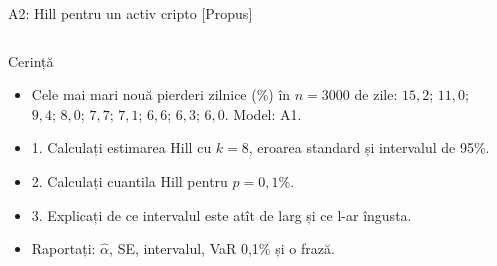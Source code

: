 \begin{frame}{A2: Hill pentru un activ cripto [Propus]}
\propsub
\itemsize{\scriptsize}
\begin{columns}[T]
\begin{column}{\taskw}
\begin{block}{Cerință}
\begin{itemize}
    \item Cele mai mari nouă pierderi zilnice (\%) în $n = 3000$ de zile: $15{,}2$; $11{,}0$; $9{,}4$; $8{,}0$; $7{,}7$; $7{,}1$; $6{,}6$; $6{,}3$; $6{,}0$. Model: A1.
    \item 1. Calculați estimarea Hill cu $k = 8$, eroarea standard și intervalul de 95\%.
    \item 2. Calculați cuantila Hill pentru $p = 0{,}1\%$.
    \item 3. Explicați de ce intervalul este atît de larg și ce l-ar îngusta.
    \item Raportați: $\hat\alpha$, SE, intervalul, VaR 0,1\% și o frază.
\end{itemize}
\end{block}
\end{column}
\begin{column}{\solw}
\end{column}
\end{columns}
\end{frame}

